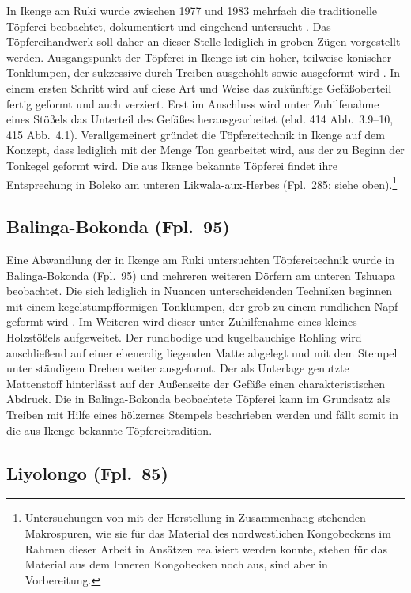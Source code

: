 In Ikenge am Ruki \parencite[Fpl.~20, siehe][542~Karte~1]{Wotzka.1995} wurde zwischen 1977 und 1983 mehrfach die traditionelle Töpferei beobachtet, dokumentiert und eingehend untersucht \parencites{Eggert.1980c}{Wotzka.1991}. Das Töpfereihandwerk soll daher an dieser Stelle lediglich in groben Zügen vorgestellt werden. Ausgangspunkt der Töpferei in Ikenge ist ein hoher, teilweise konischer Tonklumpen, der sukzessive durch Treiben ausgehöhlt sowie ausgeformt wird \parencite[414 Abb.~3]{Eggert.1980c}. In einem ersten Schritt wird auf diese Art und Weise das zukünftige Gefäßoberteil fertig geformt und auch verziert. Erst im Anschluss wird unter Zuhilfenahme eines Stößels das Unterteil des Gefäßes herausgearbeitet (ebd. 414 Abb.~3.9--10, 415 Abb.~4.1). Verallgemeinert gründet die Töpfereitechnik in Ikenge auf dem Konzept, dass lediglich mit der Menge Ton gearbeitet wird, aus der zu Beginn der Tonkegel geformt wird. Die aus Ikenge bekannte Töpferei findet ihre Entsprechung in Boleko am unteren Likwala-aux-Herbes (Fpl.~285; siehe oben).\footnote{Untersuchungen von mit der Herstellung in Zusammenhang stehenden Makrospuren, wie sie für das Material des nordwestlichen Kongobeckens im Rahmen dieser Arbeit in Ansätzen realisiert werden konnte, stehen für das Material aus dem Inneren Kongobecken noch aus, sind aber in Vorbereitung.}


\subsection*{Balinga-Bokonda (Fpl.~95)}

Eine Abwandlung der in Ikenge am Ruki untersuchten Töpfereitechnik wurde in Balinga-Bokonda (Fpl.~95) und mehreren weiteren Dörfern am unteren Tshuapa beobachtet. Die sich lediglich in Nuancen unterscheidenden Techniken beginnen mit einem kegelstumpfförmigen Tonklumpen, der grob zu einem rundlichen Napf geformt wird \parencite[188]{Wotzka.1995}. Im Weiteren wird dieser unter Zuhilfenahme eines kleines Holzstößels aufgeweitet. Der rundbodige und kugelbauchige Rohling wird anschließend auf einer ebenerdig liegenden Matte abgelegt und mit dem Stempel unter ständigem Drehen weiter ausgeformt. Der als Unterlage genutzte Mattenstoff hinterlässt auf der Außenseite der Gefäße einen charakteristischen Abdruck. Die in Balinga-Bokonda beobachtete Töpferei kann im Grundsatz als Treiben mit Hilfe eines hölzernes Stempels beschrieben werden und fällt somit in die aus Ikenge bekannte Töpfereitradition.


\subsection*{Liyolongo (Fpl.~85)}

